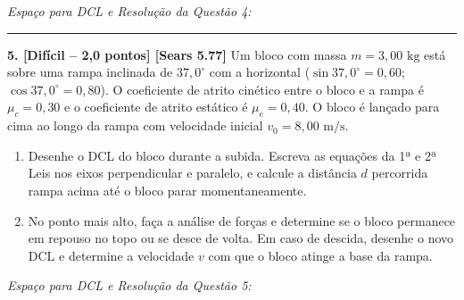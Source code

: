 \documentclass[10pt,a4paper]{article}
\begin{document}
\vspace{0.2cm}
\noindent\textit{\footnotesize Espaço para DCL e Resolução da Questão 4:}
\vspace{9.5cm}
\hrule
\vspace{3mm}

\noindent
\textbf{5. [Difícil -- 2,0 pontos] [Sears 5.77]} Um bloco com massa $m = 3,00\text{ kg}$ está sobre uma rampa inclinada de $37,0^\circ$ com a horizontal ($\sin 37,0^\circ = 0,60$; $\cos 37,0^\circ = 0,80$). O coeficiente de atrito cinético entre o bloco e a rampa é $\mu_c = 0,30$ e o coeficiente de atrito estático é $\mu_e = 0,40$. O bloco é lançado para cima ao longo da rampa com velocidade inicial $v_0 = 8,00\text{ m/s}$.
\begin{enumerate}[label=\alph*),itemsep=0pt,topsep=1pt]
    \item Desenhe o DCL do bloco durante a subida. Escreva as equações da 1ª e 2ª Leis nos eixos perpendicular e paralelo, e calcule a distância $d$ percorrida rampa acima até o bloco parar momentaneamente.
    \item No ponto mais alto, faça a análise de forças e determine se o bloco permanece em repouso no topo ou se desce de volta. Em caso de descida, desenhe o novo DCL e determine a velocidade $v$ com que o bloco atinge a base da rampa.
\end{enumerate}

\vspace{0.2cm}
\noindent\textit{\footnotesize Espaço para DCL e Resolução da Questão 5:}
\vspace{9.5cm}
\end{document}
